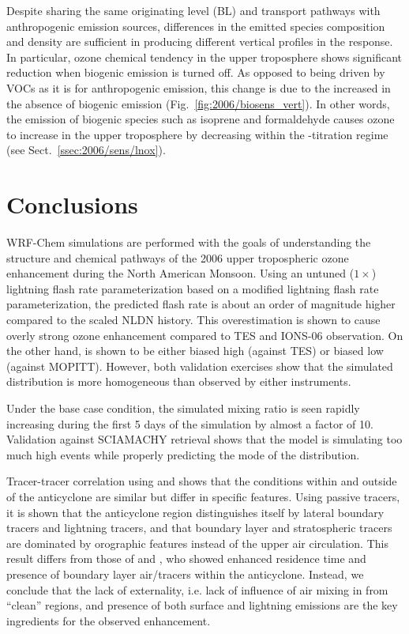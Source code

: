 Despite sharing the same originating level (BL) and transport pathways with anthropogenic emission sources, differences
in the emitted species composition and density are sufficient in producing different vertical profiles in the response. In
particular, ozone chemical tendency in the upper troposphere shows significant reduction when biogenic emission is
turned off. As opposed to being driven by VOCs as it is for anthropogenic emission, this change is due to the increased
 in the absence of biogenic emission (Fig.~\ref{fig:2006/biosens_vert}). In other words, the emission of
biogenic species such as isoprene and formaldehyde causes ozone to increase in the upper troposphere by decreasing
 within the -titration regime (see Sect.~\ref{ssec:2006/sens/lnox}).

\newpage\section{Conclusions}\label{sec:2006/conslusion}

WRF-Chem simulations are performed with the goals of understanding the structure and chemical pathways of
the 2006 upper tropospheric ozone enhancement during the North American Monsoon. Using an untuned ($1\times$)
lightning flash rate parameterization based on a modified \citet{Price:1992wb} lightning flash rate parameterization, the predicted flash rate is about an order
of magnitude higher compared to the scaled NLDN history. This overestimation is shown to cause overly strong ozone
enhancement compared to TES and IONS-06 observation. On the other hand,  is shown to be either
biased high (against TES) or biased low (against MOPITT). However, both validation exercises show that
the simulated  distribution is more homogeneous than observed by either instruments.

Under the base case condition, the simulated  mixing ratio is seen rapidly increasing during the first 5
days of the simulation by almost a factor of 10. Validation against SCIAMACHY  retrieval shows that
the model is simulating too much high  events while properly predicting the mode of the distribution.

Tracer-tracer correlation using  and  shows that the conditions within and outside of the
anticyclone are similar but differ in specific features. Using passive tracers, it is shown that the anticyclone region
distinguishes itself by lateral boundary tracers and lightning tracers, and that boundary layer and stratospheric tracers
are dominated by orographic features instead of the upper air circulation. This result
differs from those of \citet{Cooper:2007cr} and \citet{Barth:2012qf}, who showed enhanced residence time and presence
of boundary layer air/tracers within the anticyclone. Instead, we conclude that the
lack of externality, i.e. lack of influence of air mixing in from ``clean'' regions, and presence of both surface and lightning
emissions are the key ingredients for the observed enhancement.

